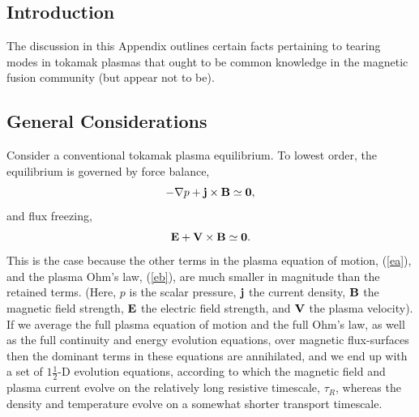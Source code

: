 \documentclass[12pt,prb,aps]{revtex4-1}
\begin{document}
\subsection{Introduction}
The discussion in this Appendix outlines certain facts pertaining
to tearing modes in tokamak plasmas that ought to be common knowledge in the 
magnetic fusion community (but appear not to be). 

\subsection{General Considerations}\label{general}
Consider a conventional tokamak plasma equilibrium. To lowest order, the equilibrium is governed by force balance,
\begin{equation}\label{ea}
-\nabla p + {\bf j}\times {\bf B} \simeq {\bf 0},
\end{equation}
and
flux freezing,
\begin{equation}\label{eb}
{\bf E} + {\bf V}\times {\bf B} \simeq {\bf 0}.
\end{equation}
This is the case because the other terms in the plasma equation of motion,
(\ref{ea}), and the plasma Ohm's law, (\ref{eb}), are much
smaller in magnitude than the retained terms. (Here, $p$ is the
scalar pressure, ${\bf j}$ the current density, ${\bf B}$ the
magnetic field strength, ${\bf E}$ the electric field strength, and ${\bf V}$ the plasma velocity). If we average the full plasma equation of motion and the full Ohm's law, as well as the full continuity and energy evolution equations, over magnetic flux-surfaces
then the dominant terms in these equations are annihilated, and
we end up with a set of $1\tfrac{1}{2}$-D evolution equations,
according to which the magnetic field and plasma current
evolve on the relatively long resistive timescale, $\tau_R$,
whereas the density and temperature evolve on a somewhat
shorter transport timescale.\cite{transp,gim}
\end{document}
